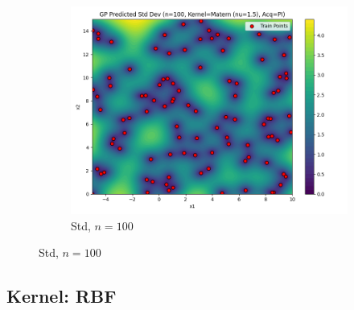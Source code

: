 \documentclass[a4paper,12pt]{article}
\begin{document}
\begin{figure}[H]
\begin{subfigure}{0.3\textwidth}
    \includegraphics[width=\linewidth]{Task-02/images/gp_std_matern_n100_PI.png}
    \caption{Std, $n=100$}
\end{subfigure}
\end{figure}

\subsection*{Kernel: RBF}
\end{document}
